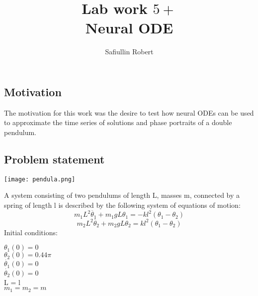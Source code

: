 \documentclass{article}
\title{Lab work $5+$\\ Neural ODE }
\author{Safiullin Robert}
\date{}
\begin{document}
\maketitle



\subsection*{Motivation}
The motivation for this work was the desire to test how neural ODEs can be used to approximate the time series of solutions and phase portraits of a double pendulum.
\subsection*{Problem statement}
\begin{center}
    
\texttt{[image: pendula.png]}
\end{center}

A system consisting of two pendulums of length L, masses m, connected by a spring of length l is described by the following system of equations of motion: 
\begin{equation}
    m_1 L^2 \ddot{\theta_1} + m_1 g L \theta_1 = -kl^2(\theta_1 - \theta_2) 
\end{equation}
\begin{equation}
    m_2 L^2 \ddot{\theta_2} + m_2 g L \theta_2 = kl^2(\theta_1 - \theta_2)
\end{equation}
Initial conditions: \\
\begin{center}
    

$\theta_1(0) = 0$ \\
$\theta_2(0) = 0.44 \pi$ \\
$\dot{\theta_1}(0) = 0$ \\
$\dot{\theta_2}(0) = 0$ \\
L = l \\
$m_1 = m_2 = m$
\end{center}

\newpage
\end{document}
